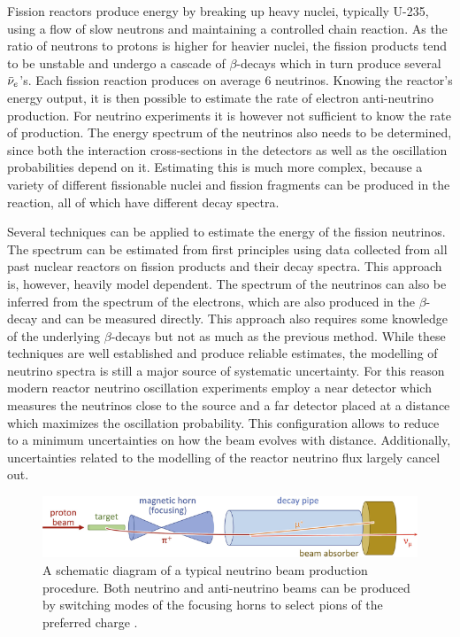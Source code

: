 Fission reactors produce energy by breaking up heavy nuclei, typically U-235, using a flow of slow neutrons and maintaining a controlled chain reaction. As the ratio of neutrons to protons is higher for heavier nuclei, the fission products tend to be unstable and undergo a cascade of $\beta$-decays which in turn produce several $\Bar{\nu}_e$'s. Each fission reaction produces on average 6 neutrinos. Knowing the reactor's energy output, it is then possible to estimate the rate of electron anti-neutrino production. For neutrino experiments it is however not sufficient to know the rate of production. The energy spectrum of the neutrinos also needs to be determined, since both the interaction cross-sections in the detectors as well as the oscillation probabilities depend on it. Estimating this is much more complex, because a variety of different fissionable nuclei and fission fragments can be produced in the reaction, all of which have different decay spectra. 

Several techniques can be applied to estimate the energy of the fission neutrinos. The spectrum can be estimated from first principles using data collected from all past nuclear reactors on fission products and their decay spectra. This approach is, however, heavily model dependent. The spectrum of the neutrinos can also be inferred from the spectrum of the electrons, which are also produced in the $\beta$-decay and can be measured directly. This approach also requires some knowledge of the underlying $\beta$-decays but not as much as the previous method. While these techniques are well established and produce reliable estimates, the modelling of neutrino spectra is still a major source of systematic uncertainty. For this reason modern reactor neutrino oscillation experiments employ a near detector which measures the neutrinos close to the source and a far detector placed at a distance which maximizes the oscillation probability. This configuration allows to reduce to a minimum uncertainties on how the beam evolves with distance. Additionally, uncertainties related to the modelling of the reactor neutrino flux largely cancel out.

\begin{figure}
    \centering
    \includegraphics[width=\linewidth]{figures//ch2-Theory/NeutrinoBeam2.png}
    \caption[A schematic diagram of a typical neutrino beam production procedure.]{A schematic diagram of a typical neutrino beam production procedure. Both neutrino and anti-neutrino beams can be produced by switching modes of the focusing horns to select pions of the preferred charge \cite{Wurm2021}. }
    \label{fig:Neutrino beam}
\end{figure}

